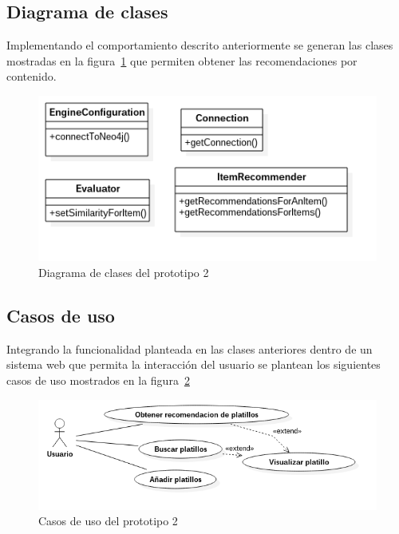     \subsection{Diagrama de clases}
    Implementando el comportamiento descrito anteriormente se generan las clases mostradas en la figura~\ref{fig: diagrama clases p2} que permiten obtener las recomendaciones por contenido. 
          \begin{figure}[h!]
          \centering
          \includegraphics[width=12cm]{./images/p2_classes.png}
          \caption{Diagrama de clases del prototipo 2}
          \label{fig: diagrama clases p2}
        \end{figure}

    \subsection{Casos de uso}
    Integrando la funcionalidad planteada en las clases anteriores dentro de un sistema web que permita la interacción del usuario se plantean los siguientes casos de uso mostrados en la figura~\ref{fig:CU p2}
    \begin{figure}[h!]
      \centering
      \includegraphics[width=16cm]{./images/prototipo2.png}
      \caption{Casos de uso del prototipo 2}
      \label{fig:CU p2}
    \end{figure}
    

